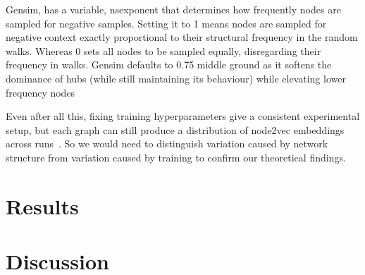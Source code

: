 \documentclass[aps,pre,reprint,superscriptaddress,longbibliography]{revtex4-2}
\begin{document}
Gensim, has a variable, nsexponent that determines how frequently nodes are sampled for negative samples. 
Setting it to 1 means nodes are sampled for negative context exactly proportional to their structural frequency in the random walks. 
Whereas 0 sets all nodes to be sampled equally, disregarding their frequency in walks. 
Gensim defaults to 0.75 middle ground as it softens the dominance of hubs (while still maintaining its behaviour) while elevating lower frequency nodes 



Even after all this, fixing training hyperparameters give a consistent experimental setup, but each graph can still produce a distribution of node2vec embeddings across runs~\cite{hacker2022surprising}. 
So we would need to distinguish variation caused by network structure from variation caused by training to confirm our theoretical findings. 


\section{Results}
\label{sec:results}


\section{Discussion}
\label{sec:discussion}


%
%

\nocite{*}

\end{document}
